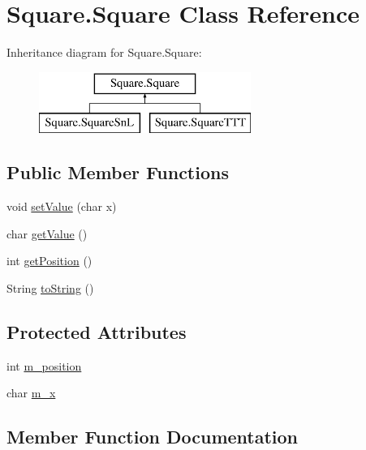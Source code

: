 \hypertarget{class_square_1_1_square}{}\section{Square.\+Square Class Reference}
\label{class_square_1_1_square}
Inheritance diagram for Square.\+Square\+:\begin{figure}[H]
\begin{center}
\leavevmode
\includegraphics[height=2.000000cm]{class_square_1_1_square}
\end{center}
\end{figure}
\subsection*{Public Member Functions}
\begin{DoxyCompactItemize}
\item 
void \hyperlink{class_square_1_1_square_a660b369288339117bda29e9a47dae8f6}{set\+Value} (char x)
\item 
char \hyperlink{class_square_1_1_square_a0afb61e6814c61ae2036b15a1a958e6f}{get\+Value} ()
\item 
int \hyperlink{class_square_1_1_square_a270f9a35b0432406d2464201ece4c6b0}{get\+Position} ()
\item 
String \hyperlink{class_square_1_1_square_ab94a6f61d25fde4e49055fcb09d6f33a}{to\+String} ()
\end{DoxyCompactItemize}
\subsection*{Protected Attributes}
\begin{DoxyCompactItemize}
\item 
int \hyperlink{class_square_1_1_square_a459ef3208bfff1bc1a693a335c2cd5e5}{m\+\_\+position}
\item 
char \hyperlink{class_square_1_1_square_a9e0779af7f8cbe54b28f95bb4a5d165a}{m\+\_\+x}
\end{DoxyCompactItemize}


\subsection{Member Function Documentation}
\hypertarget{class_square_1_1_square_a270f9a35b0432406d2464201ece4c6b0}{}
